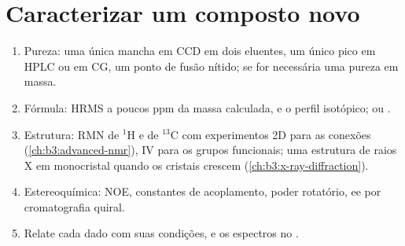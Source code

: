 \section{Caracterizar um composto novo}

\begin{method}\label{met:b3:lab-techniques-3:characterise}
\begin{enumerate}
  \item Pureza: uma única mancha em CCD em dois eluentes, um único pico em HPLC ou em CG, um ponto de fusão
        nítido;  se for necessária uma pureza em massa.
  \item Fórmula: HRMS a poucos ppm da massa calculada, e o perfil
        isotópico; ou .
  \item Estrutura: RMN de $^1$H e de $^{13}$C com experimentos 2D para as conexões
        (\cref{ch:b3:advanced-nmr}), IV para os grupos funcionais; uma estrutura de
        raios X em monocristal quando os cristais crescem (\cref{ch:b3:x-ray-diffraction}).
  \item Estereoquímica: NOE, constantes de acoplamento, poder rotatório, ee por
        cromatografia quiral.
  \item Relate cada dado com suas condições, e os espectros no .
\end{enumerate}
\end{method}

